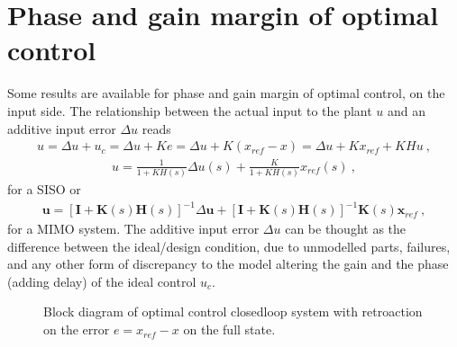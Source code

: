 \documentclass[letterpaper,10pt,english]{jupyterBook}
\begin{document}
\section{Phase and gain margin of optimal control}
\label{\detokenize{ch/control/optimal-control-margins:phase-and-gain-margin-of-optimal-control}}\label{\detokenize{ch/control/optimal-control-margins:control-optimal-margins}}\label{\detokenize{ch/control/optimal-control-margins::doc}}
\sphinxAtStartPar
Some results are available for phase and gain margin of optimal control, on the input side.  
The relationship between the actual input to the plant \(u\) and an additive input error \(\Delta u\) reads
\begin{equation*}
\begin{split}u = \Delta u + u_c = \Delta u + K e = \Delta u + K (x_{ref} - x) = \Delta u + K x_{ref} + K H u \ ,\end{split}
\end{equation*}\begin{equation}\label{equation:ch/control/optimal-control-margins:eq:optimal:input:siso:tfs}
\begin{split}u = \frac{1}{1 + K H(s)} \Delta u(s) + \frac{K}{1 + KH(s)} x_{ref}(s) \ ,\end{split}
\end{equation}
\sphinxAtStartPar
for a SISO or
\begin{equation}\label{equation:ch/control/optimal-control-margins:eq:optimal:input:mimo:tfs}
\begin{split}\mathbf{u} = \left[ \mathbf{I} + \mathbf{K}(s) \mathbf{H}(s) \right]^{-1} \Delta\mathbf{u} + \left[ \mathbf{I} + \mathbf{K}(s) \mathbf{H}(s) \right]^{-1} \mathbf{K}(s) \mathbf{x}_{ref} \ ,\end{split}
\end{equation}
\sphinxAtStartPar
for a MIMO system. The additive input error \(\Delta u\) can be thought as the difference between the ideal/design condition, due to un\sphinxhyphen{}modelled parts, failures, and any other form of discrepancy to the model altering the gain and the phase (adding delay) of the ideal control \(u_c\).

\begin{figure}[htbp]
\centering
\capstart

\noindent{}
\caption{Block diagram of optimal control closed\sphinxhyphen{}loop system with retroaction on the error \(e = x_{ref} - x\) on the full state.}\label{\detokenize{ch/control/optimal-control-margins:fig-optimal-control-margin-block}}\end{figure}
\end{document}
